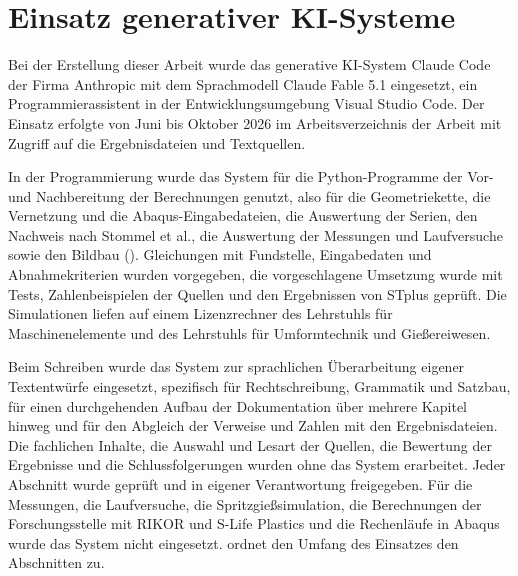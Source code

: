 \chapter*{Einsatz generativer KI-Systeme}
\label{chap:ki_verzeichnis}
\setcounter{table}{0}
\renewcommand{\thetable}{KI.\arabic{table}}

Bei der Erstellung dieser Arbeit wurde das generative KI-System Claude Code der Firma Anthropic mit dem Sprachmodell Claude Fable 5.1 eingesetzt, ein Programmierassistent in der Entwicklungsumgebung Visual Studio Code. Der Einsatz erfolgte von Juni bis Oktober 2026 im Arbeitsverzeichnis der Arbeit mit Zugriff auf die Ergebnisdateien und Textquellen.

In der Programmierung wurde das System für die Python-Programme der Vor- und Nachbereitung der Berechnungen genutzt, also für die Geometriekette, die Vernetzung und die Abaqus-Eingabedateien, die Auswertung der Serien, den Nachweis nach Stommel et al., die Auswertung der Messungen und Laufversuche sowie den Bildbau (). Gleichungen mit Fundstelle, Eingabedaten und Abnahmekriterien wurden vorgegeben, die vorgeschlagene Umsetzung wurde mit Tests, Zahlenbeispielen der Quellen und den Ergebnissen von STplus geprüft. Die Simulationen liefen auf einem Lizenzrechner des Lehrstuhls für Maschinenelemente und des Lehrstuhls für Umformtechnik und Gießereiwesen.

Beim Schreiben wurde das System zur sprachlichen Überarbeitung eigener Textentwürfe eingesetzt, spezifisch für Rechtschreibung, Grammatik und Satzbau, für einen durchgehenden Aufbau der Dokumentation über mehrere Kapitel hinweg und für den Abgleich der Verweise und Zahlen mit den Ergebnisdateien. Die fachlichen Inhalte, die Auswahl und Lesart der Quellen, die Bewertung der Ergebnisse und die Schlussfolgerungen wurden ohne das System erarbeitet. Jeder Abschnitt wurde geprüft und in eigener Verantwortung freigegeben. Für die Messungen, die Laufversuche, die Spritzgießsimulation, die Berechnungen der Forschungsstelle mit RIKOR und S-Life Plastics und die Rechenläufe in Abaqus wurde das System nicht eingesetzt.  ordnet den Umfang des Einsatzes den Abschnitten zu.

